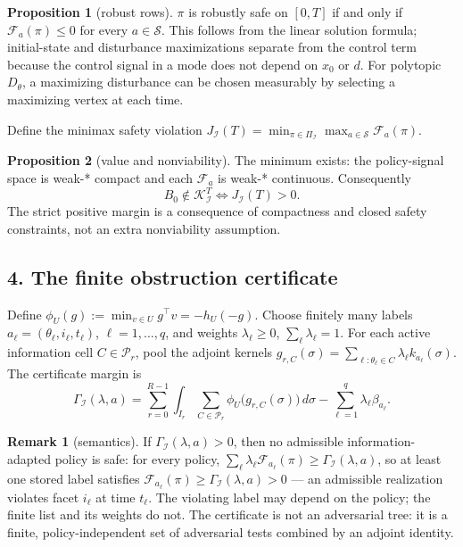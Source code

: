 \documentclass[10pt,twocolumn]{article}
\theoremstyle{definition}
\newtheorem{proposition}{Proposition}
\newtheorem{remark}{Remark}
\begin{document}
\begin{proposition}[robust rows]\label{prop:rows}
\(\pi\) is robustly safe on \([0,T]\) if and only if
\(\mathcal{F}_a(\pi) \le 0\) for every \(a \in \mathscr{S}\). This follows
from the linear solution formula; initial-state and disturbance maximizations
separate from the control term because the control signal in a mode does not
depend on \(x_0\) or \(d\). For polytopic \(D_\theta\), a maximizing
disturbance can be chosen measurably by selecting a maximizing vertex at each
time.
\end{proposition}

Define the minimax safety violation
\(J_{\mathcal{I}}(T) = \min_{\pi \in \Pi_{\mathcal{I}}} \max_{a \in
\mathscr{S}} \mathcal{F}_a(\pi)\).

\begin{proposition}[value and nonviability]\label{prop:value}
The minimum exists: the policy-signal space is weak-* compact and each
\(\mathcal{F}_a\) is weak-* continuous. Consequently
\[
B_0 \notin \mathcal{K}_{\mathcal{I}}^T
\iff
J_{\mathcal{I}}(T) > 0.
\]
The strict positive margin is a consequence of compactness and closed safety
constraints, not an extra nonviability assumption.
\end{proposition}

\subsection{4. The finite obstruction certificate}\label{certificate}

Define \(\phi_U(g) := \min_{v \in U} g^\top v = -h_U(-g)\). Choose finitely
many labels \(a_\ell = (\theta_\ell, i_\ell, t_\ell)\), \(\ell = 1,\dots,q\),
and weights \(\lambda_\ell \ge 0\), \(\sum_\ell \lambda_\ell = 1\). For each
active information cell \(C \in \mathcal{P}_r\), pool the adjoint kernels
\(g_{r,C}(\sigma) = \sum_{\ell : \theta_\ell \in C} \lambda_\ell
k_{a_\ell}(\sigma)\). The certificate margin is
\[
\Gamma_{\mathcal{I}}(\lambda, a)
= \sum_{r=0}^{R-1} \int_{I_r} \sum_{C \in \mathcal{P}_r}
\phi_U\!\bigl(g_{r,C}(\sigma)\bigr)\, d\sigma
- \sum_{\ell=1}^q \lambda_\ell \beta_{a_\ell}.
\tag{1}
\]

\begin{remark}[semantics]\label{rem:semantics}
If \(\Gamma_{\mathcal{I}}(\lambda, a) > 0\), then no admissible
information-adapted policy is safe: for every policy,
\(\sum_\ell \lambda_\ell \mathcal{F}_{a_\ell}(\pi) \ge
\Gamma_{\mathcal{I}}(\lambda, a)\), so at least one stored label satisfies
\(\mathcal{F}_{a_\ell}(\pi) \ge \Gamma_{\mathcal{I}}(\lambda, a) > 0\) ---
an admissible realization violates facet \(i_\ell\) at time \(t_\ell\). The
violating label may depend on the policy; the finite list and its weights do
not. The certificate is not an adversarial tree: it is a finite,
policy-independent set of adversarial tests combined by an adjoint identity.
\end{remark}
\end{document}
